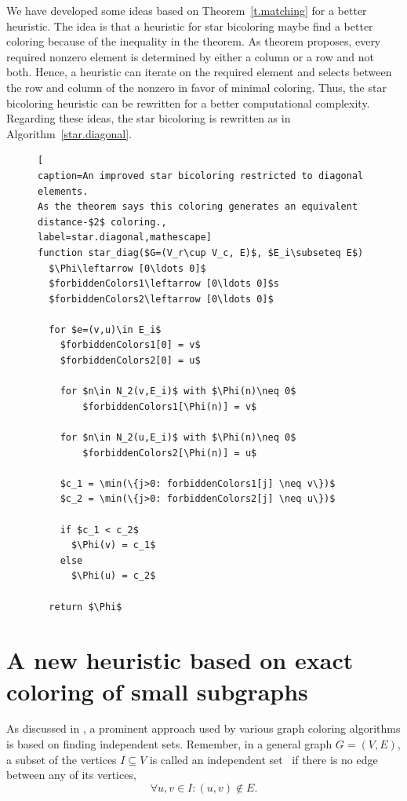 \documentclass[12pt, twoside,a4paper,toc=bibliography]{scrbook}
\newcommand{\coderef}[1]{Algorithm~\protect\ref{#1}}
\begin{document}
We have developed some ideas based on Theorem~\ref{t.matching}
for a better heuristic. The idea is that a heuristic for star bicoloring maybe
find a better coloring because of the inequality in the theorem.
As theorem proposes, every required nonzero element
is determined by either a column or a row and not both. Hence, a heuristic
can iterate on the required element and selects between the row and column of
the nonzero in favor of minimal coloring.
Thus, the star bicoloring heuristic can be rewritten for a better computational complexity.
Regarding these ideas, the star bicoloring is rewritten as in \coderef{star.diagonal}.
\begin{figure}
\begin{lstlisting}[
caption=An improved star bicoloring restricted to diagonal elements.
As the theorem says this coloring generates an equivalent distance-$2$ coloring.,
label=star.diagonal,mathescape]
function star_diag($G=(V_r\cup V_c, E)$, $E_i\subseteq E$)
  $\Phi\leftarrow [0\ldots 0]$
  $forbiddenColors1\leftarrow [0\ldots 0]$s
  $forbiddenColors2\leftarrow [0\ldots 0]$
  
  for $e=(v,u)\in E_i$
    $forbiddenColors1[0] = v$
    $forbiddenColors2[0] = u$

    for $n\in N_2(v,E_i)$ with $\Phi(n)\neq 0$
        $forbiddenColors1[\Phi(n)] = v$

    for $n\in N_2(u,E_i)$ with $\Phi(n)\neq 0$
        $forbiddenColors2[\Phi(n)] = u$

    $c_1 = \min(\{j>0: forbiddenColors1[j] \neq v\})$
    $c_2 = \min(\{j>0: forbiddenColors2[j] \neq u\})$

    if $c_1 < c_2$
      $\Phi(v) = c_1$
    else
      $\Phi(u) = c_2$

  return $\Phi$
\end{lstlisting}
\end{figure}

\clearpage
\section{A new heuristic based on exact coloring of small subgraphs}
\label{s.exact}
As discussed in \cite{Fomin2013}, a prominent approach used by various graph coloring
algorithms is based on finding independent sets. Remember, 
in a general graph $G=(V,E)$, a subset of the vertices $I\subseteq V$ is
called an independent set~\cite{bondy2008graph} 
if there is no edge between any of its vertices,
$$\forall u,v\in I: (u,v)\notin E.$$
\end{document}
